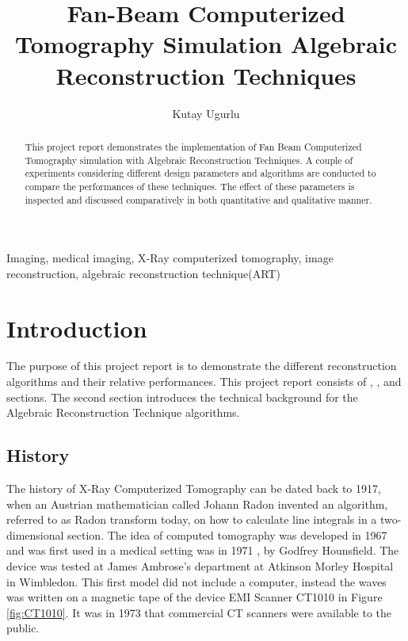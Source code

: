 \documentclass[journal]{IEEEtran}
\title{Fan-Beam Computerized Tomography Simulation \newline Algebraic Reconstruction Techniques}
\author{Kutay Ugurlu}
\begin{document}

\maketitle

\begin{abstract}This project report demonstrates the implementation of Fan Beam Computerized Tomography simulation with Algebraic Reconstruction Techniques. A couple of experiments considering different design parameters and algorithms are conducted to compare the performances of these techniques. The effect of these parameters is inspected and discussed comparatively in both quantitative and qualitative manner.
\end{abstract}
\begin{IEEEkeywords}
	Imaging, medical imaging, X-Ray computerized tomography, image reconstruction, algebraic reconstruction technique(ART)
\end{IEEEkeywords}

\section{Introduction} \label{sec:intro}
The purpose of this project report is to demonstrate the different reconstruction algorithms and their relative performances. This project report consists of , ,  and  sections. The second section introduces the technical background for the Algebraic Reconstruction Technique algorithms.  

\subsection{History}
The history of X-Ray Computerized Tomography can be dated back to 1917, when an Austrian mathematician called Johann Radon invented an algorithm, referred to as Radon transform today, on how to calculate line integrals in a two-dimensional section. The idea of computed tomography was developed in 1967 and was first used in a medical setting was in 1971 \cite{richmond2004sir}, by Godfrey Hounsfield. The device was tested at
James Ambrose’s department at Atkinson Morley Hospital in Wimbledon. This first model did not include a computer, instead the waves was written on a magnetic tape of the device EMI Scanner CT1010 in Figure \ref{fig:CT1010}. It was in 1973 that commercial CT scanners were available to the public. \cite{CTHist}
\end{document}
